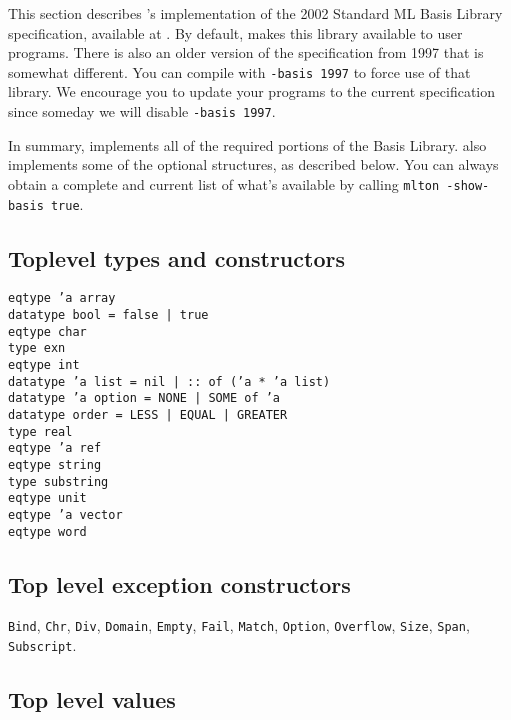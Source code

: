 
This section describes {\mlton}'s implementation of the 2002 Standard ML
Basis Library specification, available at
.
By default, {\mlton} makes this library available to user programs.
There is also an older version of the specification from 1997 that is
somewhat different.  You can compile with {\tt -basis 1997} to force
use of that library.  We encourage you to update your programs to the
current specification since someday we will disable {\tt -basis 1997}.

In summary, {\mlton} implements all of the required portions of the
Basis Library.  {\mlton} also implements some of the optional
structures, as described below.  You can always obtain a complete and
current list of what's available by calling {\tt mlton -show-basis
true}.

\subsection{Toplevel types and constructors}
{
\tt eqtype 'a array\\
\tt datatype bool = false | true\\
\tt eqtype char\\
\tt type exn\\
\tt eqtype int\\
\tt datatype 'a list = nil | :: of ('a * 'a list)\\
\tt datatype 'a option = NONE | SOME of 'a\\
\tt datatype order = LESS | EQUAL | GREATER\\
\tt type real\\
\tt eqtype 'a ref\\
\tt eqtype string\\
\tt type substring\\
\tt eqtype unit\\
\tt eqtype 'a vector\\
\tt eqtype word\\
}

\subsection{Top level exception constructors}
{\tt Bind},
{\tt Chr},
{\tt Div},
{\tt Domain},
{\tt Empty},
{\tt Fail},
{\tt Match},
{\tt Option},
{\tt Overflow},
{\tt Size},
{\tt Span},
{\tt Subscript}.

\subsection{Top level values}

